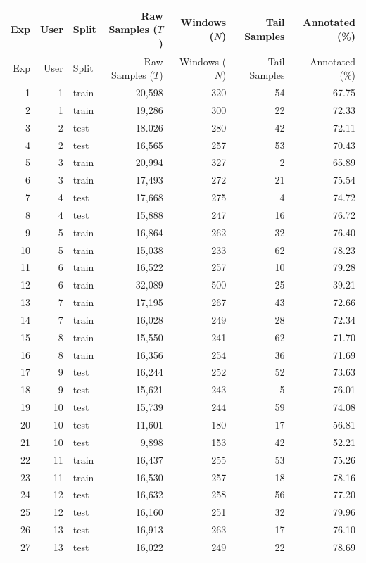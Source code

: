 \documentclass[11pt,a4paper]{article}
\theoremstyle{definition}
\begin{document}
\begin{longtable}{@{}rrlrrrr@{}}\toprule
Exp & User & Split & Raw Samples ($T$) & Windows ($N$) & Tail Samples & Annotated (\%)\\\midrule\endfirsthead
\toprule Exp & User & Split & Raw Samples ($T$) & Windows ($N$) & Tail Samples & Annotated (\%)\\\midrule\endhead
1 & 1 & train & 20,598 & 320 & 54 & 67.75\\
2 & 1 & train & 19,286 & 300 & 22 & 72.33\\
3 & 2 & test & 18.026 & 280 & 42 & 72.11\\
4 & 2 & test & 16,565 & 257 & 53 & 70.43\\
5 & 3 & train & 20,994 & 327 & 2 & 65.89\\
6 & 3 & train & 17,493 & 272 & 21 & 75.54\\
7 & 4 & test & 17,668 & 275 & 4 & 74.72\\
8 & 4 & test & 15,888 & 247 & 16 & 76.72\\
9 & 5 & train & 16,864 & 262 & 32 & 76.40\\
10 & 5 & train & 15,038 & 233 & 62 & 78.23\\
11 & 6 & train & 16,522 & 257 & 10 & 79.28\\
12 & 6 & train & 32,089 & 500 & 25 & 39.21\\
13 & 7 & train & 17,195 & 267 & 43 & 72.66\\
14 & 7 & train & 16,028 & 249 & 28 & 72.34\\
15 & 8 & train & 15,550 & 241 & 62 & 71.70\\
16 & 8 & train & 16,356 & 254 & 36 & 71.69\\
17 & 9 & test & 16,244 & 252 & 52 & 73.63\\
18 & 9 & test & 15,621 & 243 & 5 & 76.01\\
19 & 10 & test & 15,739 & 244 & 59 & 74.08\\
20 & 10 & test & 11,601 & 180 & 17 & 56.81\\
21 & 10 & test & 9,898 & 153 & 42 & 52.21\\
22 & 11 & train & 16,437 & 255 & 53 & 75.26\\
23 & 11 & train & 16,530 & 257 & 18 & 78.16\\
24 & 12 & test & 16,632 & 258 & 56 & 77.20\\
25 & 12 & test & 16,160 & 251 & 32 & 79.96\\
26 & 13 & test & 16,913 & 263 & 17 & 76.10\\
27 & 13 & test & 16,022 & 249 & 22 & 78.69\\

\end{longtable}
\end{document}
